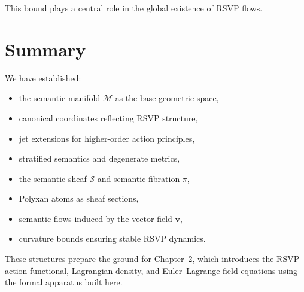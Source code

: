 This bound plays a central role in the global existence of RSVP flows.

\section{Summary}

We have established:
\begin{itemize}
  \item the semantic manifold $\mathcal{M}$ as the base geometric space,
  \item canonical coordinates reflecting RSVP structure,
  \item jet extensions for higher-order action principles,
  \item stratified semantics and degenerate metrics,
  \item the semantic sheaf $\mathscr{S}$ and semantic fibration $\pi$,
  \item Polyxan atoms as sheaf sections,
  \item semantic flows induced by the vector field $\mathbf{v}$,
  \item curvature bounds ensuring stable RSVP dynamics.
\end{itemize}

These structures prepare the ground for Chapter~2, which introduces the RSVP
action functional, Lagrangian density, and Euler--Lagrange field equations using
the formal apparatus built here.
